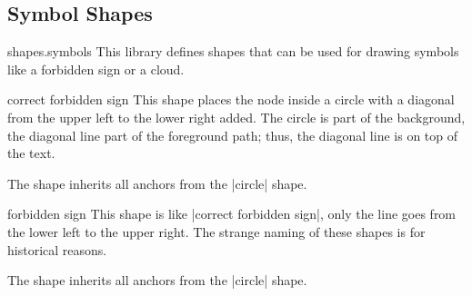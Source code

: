 \subsection{Symbol Shapes}

\begin{pgflibrary}{shapes.symbols}
    This library defines shapes that can be used for drawing symbols like a
    forbidden sign or a cloud.
\end{pgflibrary}

\begin{shape}{correct forbidden sign}
    This shape places the node inside a circle with a diagonal from the upper
    left to the lower right added. The circle is part of the background, the
    diagonal line part of the foreground path; thus, the diagonal line is on
    top of the text.
\begin{codeexample}[preamble={\usetikzlibrary{shapes.symbols}}]
\end{codeexample}

    The shape inherits all anchors from the |circle| shape.
\end{shape}

\begin{shape}{forbidden sign}
    This shape is like |correct forbidden sign|, only the line goes from the
    lower left to the upper right. The strange naming of these shapes is for
    historical reasons.
\begin{codeexample}[preamble={\usetikzlibrary{shapes.symbols}}]
\end{codeexample}

    The shape inherits all anchors from the |circle| shape.
\end{shape}

